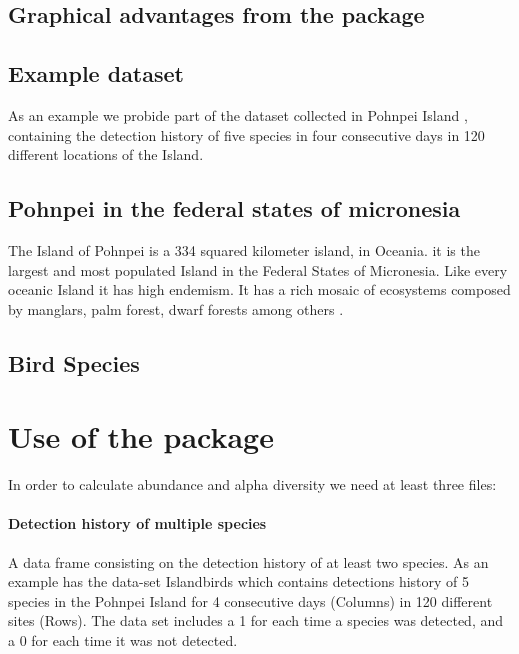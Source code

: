 \documentclass[article]{jss}
\begin{document}
\subsection{Graphical advantages from the
package}\label{graphical-advantages-from-the-package}

\subsection{Example dataset}\label{example-dataset}

As an example we probide part of the dataset collected in Pohnpei Island
\citep{oleiro2014avian}, containing the detection history of five
species in four consecutive days in 120 different locations of the
Island.

\subsection{Pohnpei in the federal states of
micronesia}\label{pohnpei-in-the-federal-states-of-micronesia}

The Island of Pohnpei is a 334 squared kilometer island, in Oceania. it
is the largest and most populated Island in the Federal States of
Micronesia. Like every oceanic Island it has high endemism. It has a
rich mosaic of ecosystems composed by manglars, palm forest, dwarf
forests among others \citep{raynor1994resource}.

\subsection{Bird Species}\label{bird-species}

\section{Use of the package}\label{use-of-the-package}

In order to calculate abundance and alpha diversity we need at least
three files:

\paragraph{Detection history of multiple
species}\label{detection-history-of-multiple-species}

A data frame consisting on the detection history of at least two
species. As an example  has the data-set
Islandbirds which contains detections history of 5 species in the
Pohnpei Island for 4 consecutive days (Columns) in 120 different sites
(Rows). The data set includes a 1 for each time a species was detected,
and a 0 for each time it was not detected.
\end{document}
